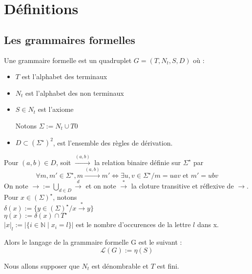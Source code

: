 \documentclass[a4paper,12pt]{article}
\title{\letitle}
\author{\leauthor}
\date{}
\newcommand{\norm}[1]{\lvert #1 \rvert}
\begin{document}
    
\maketitle
\tableofcontents

\section{Définitions}

\subsection{Les grammaires formelles}

Une grammaire formelle est un quadruplet $G = (T,N_t,S,D)$ où :

\begin{itemize}
\item $T$ est l'alphabet des terminaux
\item $N_t$ est l'alphabet des non terminaux
\item $S \in N_t$ est l'axiome

Notons $\Sigma := N_t \cup T0$
\item $D \subset (\Sigma ^ \star )^2$, est l'ensemble des règles de dérivation.
\end{itemize}
Pour $(a,b) \in D$, soit $\overset{(a,b)}{\rightarrow}$ la relation binaire définie sur $\Sigma^\star$ par
\begin{equation*}
\forall m,m' \in \Sigma^\star, m \overset{(a,b)}{\rightarrow} m' \iff \exists u,v \in \Sigma^\star / m = uav \text{ et } m' = ubv
\end{equation*}
On note $\rightarrow := \bigcup_{d \in D} \overset{d}{\rightarrow}$ et on note $\overset{*}{\rightarrow}$ la cloture transitive et réflexive de $\rightarrow$.\\
Pour $x \in (\Sigma)^\star$, notons\\
$\delta(x) := \{y \in (\Sigma)^\star / x \overset{*}{\rightarrow} y\}$\\
$\eta(x) := \delta(x) \cap T^\star$\\
$\norm{x}_l := \norm{\{i \in \mathbb{N} \mid x_i = l \}}$ est le nombre d'occurences de la lettre $l$ dans x.

Alors le langage de la grammaire formelle  G est le suivant :
\begin{equation*}\mathcal{L} (G) := \eta(S)\end{equation*}

Nous allons supposer que $N_t$ est dénombrable et $T$ est fini.
\end{document}
